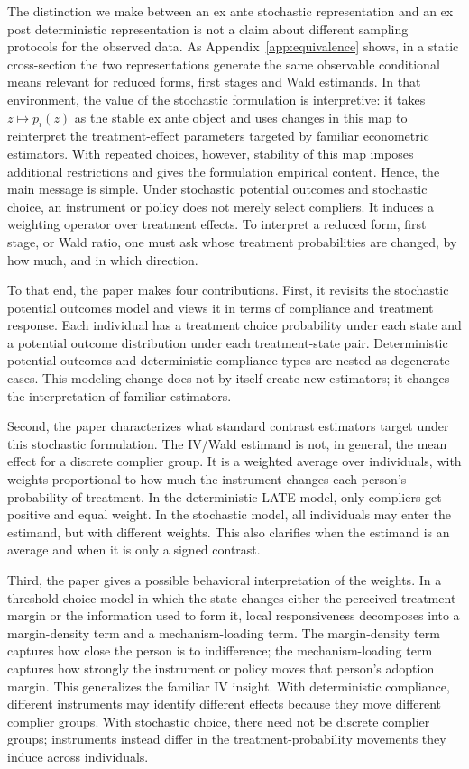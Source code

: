 \documentclass[11pt]{article}
\newcommand{\1}{\mathbf{1}}
\begin{document}
The distinction we make between an ex ante stochastic representation and an ex post deterministic representation is not a claim about different sampling protocols for the observed data. As Appendix~\ref{app:equivalence} shows, in a static cross-section the two representations generate the same observable conditional means relevant for reduced forms, first stages and Wald estimands. In that environment, the value of the stochastic formulation is interpretive: it takes \(z\mapsto p_i(z)\) as the stable ex ante object and uses changes in this map to reinterpret the treatment-effect parameters targeted by familiar econometric estimators. With repeated choices, however, stability of this map imposes additional restrictions and gives the formulation empirical content. Hence, the main message is simple. Under stochastic potential outcomes and stochastic choice, an instrument or policy does not merely select compliers. It induces a weighting operator over treatment effects. To interpret a reduced form, first stage, or Wald ratio, one must ask whose treatment probabilities are changed, by how much, and in which direction.

To that end, the paper makes four contributions. First, it revisits the stochastic potential outcomes model and views it in terms of compliance and treatment response. Each individual has a treatment choice probability under each state and a potential outcome distribution under each treatment-state pair. Deterministic potential outcomes and deterministic compliance types are nested as degenerate cases. This modeling change does not by itself create new estimators; it changes the interpretation of familiar estimators.

Second, the paper characterizes what standard contrast estimators target under this stochastic formulation. The IV/Wald estimand is not, in general, the mean effect for a discrete complier group. It is a weighted average over individuals, with weights proportional to how much the instrument changes each person's probability of treatment. In the deterministic LATE model, only compliers get positive and equal weight. In the stochastic model, all individuals may enter the estimand, but with different weights. This also clarifies when the estimand is an average and when it is only a signed contrast.

Third, the paper gives a possible behavioral interpretation of the weights. In a threshold-choice model in which the state changes either the perceived treatment margin or the information used to form it, local responsiveness decomposes into a margin-density term and a mechanism-loading term. The margin-density term captures how close the person is to indifference; the mechanism-loading term captures how strongly the instrument or policy moves that person's adoption margin. This generalizes the familiar IV insight. With deterministic compliance,
different instruments may identify different effects because they move different
complier groups. With stochastic choice, there need not be discrete complier
groups; instruments instead differ in the treatment-probability movements they
induce across individuals.
\end{document}
